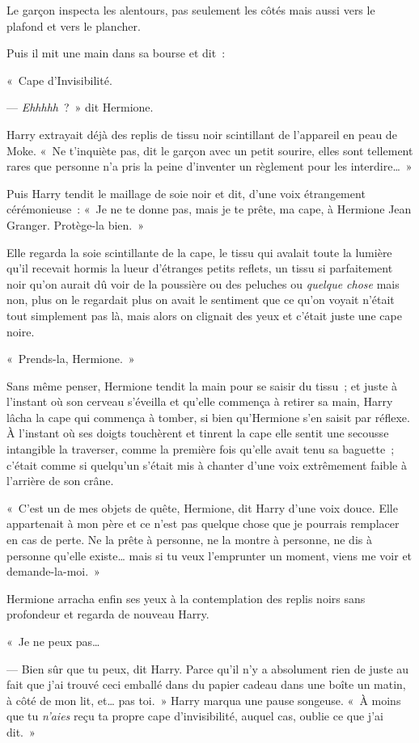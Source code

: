 Le garçon inspecta les alentours, pas seulement les côtés mais aussi vers le plafond et vers le plancher.

Puis il mit une main dans sa bourse et dit~:

«~Cape d'Invisibilité.

--- \emph{Ehhhhh}~?~» dit Hermione.

Harry extrayait déjà des replis de tissu noir scintillant de l'appareil en peau de Moke. «~Ne t'inquiète pas, dit le garçon avec un petit sourire, elles sont tellement rares que personne n'a pris la peine d'inventer un règlement pour les interdire…~»

Puis Harry tendit le maillage de soie noir et dit, d'une voix étrangement cérémonieuse~: «~Je ne te donne pas, mais je te prête, ma cape, à Hermione Jean Granger. Protège-la bien.~»

Elle regarda la soie scintillante de la cape, le tissu qui avalait toute la lumière qu'il recevait hormis la lueur d'étranges petits reflets, un tissu si parfaitement noir qu'on aurait dû voir de la poussière ou des peluches ou \emph{quelque chose} mais non, plus on le regardait plus on avait le sentiment que ce qu'on voyait n'était tout simplement pas là, mais alors on clignait des yeux et c'était juste une cape noire.

«~Prends-la, Hermione.~»

Sans même penser, Hermione tendit la main pour se saisir du tissu~; et juste à l'instant où son cerveau s'éveilla et qu'elle commença à retirer sa main, Harry lâcha la cape qui commença à tomber, si bien qu'Hermione s'en saisit par réflexe. À l'instant où ses doigts touchèrent et tinrent la cape elle sentit une secousse intangible la traverser, comme la première fois qu'elle avait tenu sa baguette~; c'était comme si quelqu'un s'était mis à chanter d'une voix extrêmement faible à l'arrière de son crâne.

«~C'est un de mes objets de quête, Hermione, dit Harry d'une voix douce. Elle appartenait à mon père et ce n'est pas quelque chose que je pourrais remplacer en cas de perte. Ne la prête à personne, ne la montre à personne, ne dis à personne qu'elle existe… mais si tu veux l'emprunter un moment, viens me voir et demande-la-moi.~»

Hermione arracha enfin ses yeux à la contemplation des replis noirs sans profondeur et regarda de nouveau Harry.

«~Je ne peux pas…

--- Bien sûr que tu peux, dit Harry. Parce qu'il n'y a absolument rien de juste au fait que j'ai trouvé ceci emballé dans du papier cadeau dans une boîte un matin, à côté de mon lit, et… pas toi.~» Harry marqua une pause songeuse. «~À moins que tu \emph{n'aies} reçu ta propre cape d'invisibilité, auquel cas, oublie ce que j'ai dit.~»

